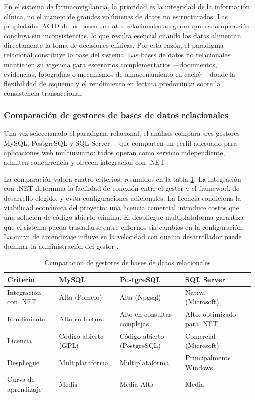 En el sistema de farmacovigilancia, la prioridad es la integridad de la información clínica, no el manejo de grandes volúmenes de datos no estructurados. 
Las propiedades ACID de las bases de datos relacionales aseguran que cada operación concluya sin inconsistencias, lo que resulta esencial cuando los datos alimentan directamente la toma de decisiones clínicas.
Por esta razón, el paradigma relacional constituye la base del sistema. 
Las bases de datos no relacionales mantienen su vigencia para escenarios complementarios —documentos, evidencias, fotografías o mecanismos de almacenamiento en caché— donde la flexibilidad de esquema y el rendimiento en lectura predominan sobre la consistencia transaccional.

\subsubsection{Comparación de gestores de bases de datos relacionales}

Una vez seleccionado el paradigma relacional, el análisis compara tres gestores —MySQL, PostgreSQL y SQL Server— que comparten un perfil adecuado para aplicaciones web multiusuario: todos operan como servicio independiente, admiten concurrencia y ofrecen integración con .NET \cite{microsoft_sql_comparison}. 

La comparación valora cuatro criterios, resumidos en la tabla \ref{tab:comparacion_sql}.
La integración con .NET determina la facilidad de conexión entre el gestor y el framework de desarrollo elegido, y evita configuraciones adicionales.
La licencia condiciona la viabilidad económica del proyecto: una licencia comercial introduce costos que una solución de código abierto elimina. 
El despliegue multiplataforma garantiza que el sistema pueda trasladarse entre entornos sin cambios en la configuración. 
La curva de aprendizaje influye en la velocidad con que un desarrollador puede dominar la administración del gestor \cite{microsoft_sql_comparison}. 


\begin{table}[H]
	\centering
	\caption{Comparación de gestores de bases de datos relacionales}
	\label{tab:comparacion_sql}
	\renewcommand{\arraystretch}{1.3}
	\begin{tabular}{|p{2.8cm}| p{3.2cm}| p{3.2cm}| p{3.2cm}| p{3.2cm}|}
		\hline
	\textbf{Criterio} & \textbf{MySQL} & \textbf{PostgreSQL} & \textbf{SQL Server}  \\[6pt]
	\hline
		Integración con .NET & Alta (Pomelo) & Alta (Npgsql) & Nativa (Microsoft)  \\ \hline
		Rendimiento & Alto en lectura & Alto en consultas complejas & Alto, optimizado para .NET  \\ \hline
		Licencia & Código abierto (GPL) & Código abierto (PostgreSQL) & Comercial (Microsoft)  \\ \hline
		Despliegue & Multiplataforma & Multiplataforma & Principalmente Windows \\ \hline
		Curva de aprendizaje & Media & Media-Alta & Media \\ \hline
	\end{tabular}
\end{table}


